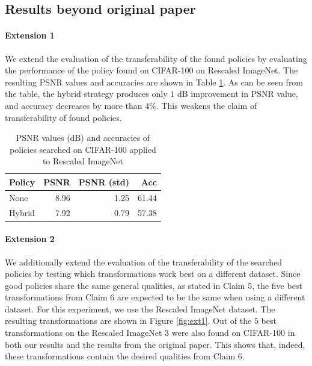 \subsection{Results beyond original paper}

\paragraph{Extension 1} We extend the evaluation of the transferability of the found policies by evaluating the performance of the policy found on CIFAR-100 on Rescaled ImageNet. The resulting PSNR values and accuracies are shown in Table \ref{tab:ext1}. As can be seen from the table, the hybrid strategy produces only $1$ dB improvement in PSNR value, and accuracy decreases by more than $4\%$. This weakens the claim of transferability of found policies.

\begin{table}[htb]
    \centering
    \begin{tabular}{lrrr}
        \hline
         Policy   &   PSNR &   PSNR (std) &   Acc \\
        \hline
         None     &        8.96 &       1.25 & 61.44 \\
         Hybrid   &        7.92 &       0.79 & 57.38 \\
        \hline
    \end{tabular}
    \caption{PSNR values (dB) and accuracies of policies searched on CIFAR-100 applied to Rescaled ImageNet}
    \label{tab:ext1}
\end{table}

\paragraph{Extension 2} We additionally extend the evaluation of the transferability of the searched policies by testing which transformations work best on a different dataset. Since good policies share the same general qualities, as stated in Claim 5, the five best transformations from Claim 6 are expected to be the same when using a different dataset. For this experiment, we use the Rescaled ImageNet dataset. The resulting transformations are shown in Figure \ref{fig:ext1}. Out of the $5$ best transformations on the Rescaled ImageNet $3$ were also found on CIFAR-100 in both our results and the results from the original paper. This shows that, indeed, these transformations contain the desired qualities from Claim 6.

